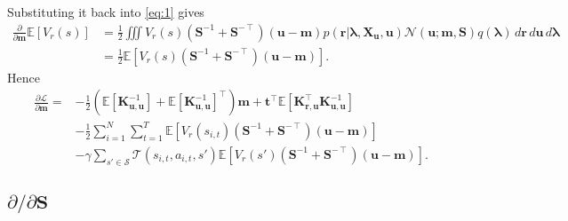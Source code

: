 \documentclass{article}
\theoremstyle{definition}
\newcommand{\Kuu}{\mathbf{K}_{\mathbf{u},\mathbf{u}}}
\newcommand{\Kru}{\mathbf{K}_{\mathbf{r},\mathbf{u}}}
\newcommand{\dm}{\frac{\partial}{\partial\mathbf{m}}}
\begin{document}
Substituting it back into \eqref{eq:1} gives
\[
  \begin{split}
    \dm\mathbb{E}[V_r(s)] &= \frac{1}{2}\iiint V_r(s)
    (\mathbf{S}^{-1} + \mathbf{S}^{-\intercal})(\mathbf{u} - \mathbf{m})
    p(\mathbf{r} | \bm\lambda, \mathbf{X_u}, \mathbf{u}) \mathcal{N}(\mathbf{u};
    \mathbf{m}, \mathbf{S})
    q(\bm\lambda)\,d\mathbf{r}\,d\mathbf{u}\,d\bm\lambda \\
    &= \frac{1}{2}\mathbb{E}[V_r(s) (\mathbf{S}^{-1} +
    \mathbf{S}^{-\intercal})(\mathbf{u} - \mathbf{m})].
\end{split}
\]
Hence
\[
  \begin{split}
    \frac{\partial\mathcal{L}}{\partial\mathbf{m}} =
    &-\frac{1}{2}(\mathbb{E}[\Kuu^{-1}] +
    \mathbb{E}[\Kuu^{-1}]^\intercal)\mathbf{m} +
    \mathbf{t}^\intercal\mathbb{E}[\Kru^\intercal\Kuu^{-1}] \\
    &- \frac{1}{2}\sum_{i=1}^N\sum_{t=1}^T \mathbb{E}[V_r(s_{i,t})
    (\mathbf{S}^{-1} + \mathbf{S}^{-\intercal})(\mathbf{u} - \mathbf{m})] \\
    &- \gamma\sum_{s' \in \mathcal{S}} \mathcal{T}(s_{i,t}, a_{i,t}, s')
    \mathbb{E}[V_r(s') (\mathbf{S}^{-1} + \mathbf{S}^{-\intercal})(\mathbf{u} -
    \mathbf{m})].
\end{split}
\]

\subsection{$\partial/\partial\mathbf{S}$}
\end{document}
